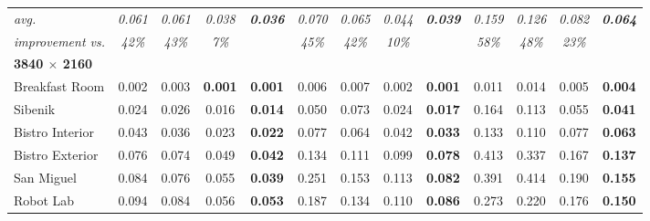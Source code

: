 \begin{table*}[t]
\begin{tabular}{l cccc|cccc|cccc}
\hline
\textit{avg.}                 & \textit{0.061} & \textit{0.061}         & \textit{0.038}          & \textit{\textbf{0.036}} & \textit{0.070} & \textit{0.065}         & \textit{0.044}          & \textit{\textbf{0.039}} & \textit{0.159} & \textit{0.126}         & \textit{0.082}          & \textit{\textbf{0.064}} \\
\textit{improvement vs.}      & \textit{42\%}  & \textit{43\%}          & \textit{7\%}            &                         & \textit{45\%}  & \textit{42\%}          & \textit{10\%}           &                         & \textit{58\%}  & \textit{48\%}          & \textit{23\%}           &                         \\
\hline
\textbf{3840 $\times$ 2160}   & & & & & & & & & & & & \\
Breakfast Room                & 0.002          & 0.003                  & \textbf{0.001}          & \textbf{0.001}          & 0.006          & 0.007                  & 0.002                   & \textbf{0.001}          & 0.011          & 0.014                  & 0.005                   & \textbf{0.004}          \\
Sibenik                       & 0.024          & 0.026                  & 0.016                   & \textbf{0.014}          & 0.050          & 0.073                  & 0.024                   & \textbf{0.017}          & 0.164          & 0.113                  & 0.055                   & \textbf{0.041}          \\
Bistro Interior               & 0.043          & 0.036                  & 0.023                   & \textbf{0.022}          & 0.077          & 0.064                  & 0.042                   & \textbf{0.033}          & 0.133          & 0.110                  & 0.077                   & \textbf{0.063}          \\
Bistro Exterior               & 0.076          & 0.074                  & 0.049                   & \textbf{0.042}          & 0.134          & 0.111                  & 0.099                   & \textbf{0.078}          & 0.413          & 0.337                  & 0.167                   & \textbf{0.137}          \\
San Miguel                    & 0.084          & 0.076                  & 0.055                   & \textbf{0.039}          & 0.251          & 0.153                  & 0.113                   & \textbf{0.082}          & 0.391          & 0.414                  & 0.190                   & \textbf{0.155}          \\
Robot Lab                     & 0.094          & 0.084                  & 0.056                   & \textbf{0.053}          & 0.187          & 0.134                  & 0.110                   & \textbf{0.086}          & 0.273          & 0.220                  & 0.176                   & \textbf{0.150}          \\

\end{tabular}
\end{table*}

